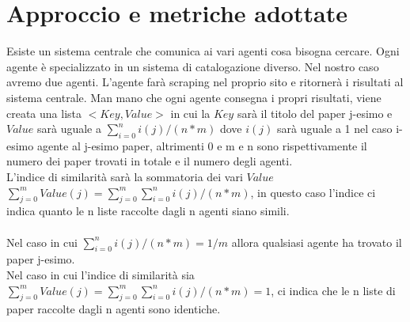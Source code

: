 \documentclass[12pt]{article}
\begin{document}
\section{Approccio e metriche adottate}
Esiste un sistema centrale che comunica ai vari agenti cosa bisogna cercare. Ogni agente \`e specializzato in un sistema di catalogazione diverso. Nel nostro caso avremo due agenti. L'agente far\`a scraping nel proprio sito e ritorner\`a i risultati al sistema centrale. Man mano che ogni agente consegna i propri risultati, viene creata una lista $<Key, Value>$ in cui la $Key$ sar\`a il titolo del paper j-esimo e $Value$ sar\`a uguale a $\displaystyle\sum\limits_{i=0}^n i(j)/(n*m)$ dove $i(j)$ sar\`a uguale a 1 nel caso i-esimo agente al j-esimo paper, altrimenti 0 e m e n sono rispettivamente il numero dei paper trovati in totale e il numero degli agenti.\\
L'indice di similarit\`a sar\`a la sommatoria dei vari $Value$ $\displaystyle\sum\limits_{j=0}^m Value(j) = \displaystyle\sum\limits_{j=0}^m \displaystyle\sum\limits_{i=0}^n i(j)/(n*m)$, in questo caso l'indice ci indica quanto le n liste raccolte dagli n agenti siano simili. \\\\
Nel caso in cui $\displaystyle\sum\limits_{i=0}^n i(j)/(n*m) = 1/m$ allora qualsiasi agente ha trovato il paper j-esimo.\\
Nel caso in cui l'indice di similarit\`a sia $\displaystyle\sum\limits_{j=0}^m Value(j) = \displaystyle\sum\limits_{j=0}^m \displaystyle\sum\limits_{i=0}^n i(j)/(n*m) = 1$, ci indica che le n liste di paper raccolte dagli n agenti sono identiche.\\
\end{document}
